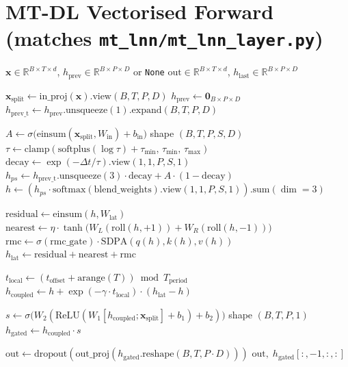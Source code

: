 \documentclass[11pt]{article}
\theoremstyle{definition}
\newcommand{\RR}{\mathbb{R}}
\newcommand{\vx}{\mathbf{x}}
\newcommand{\sigmoid}{\sigma}
\begin{document}
\appendix

\section{MT-DL Vectorised Forward (matches \texttt{mt\_lnn/mt\_lnn\_layer.py})}
\label{app:code}

\begin{algorithm}[h]
\caption{MTLNNLayer.forward — vectorised over P protofilaments}
\label{alg:mt_dl}
\begin{algorithmic}[1]
\Require $\vx\in\RR^{B\times T\times d}$,\; $h_\text{prev}\in\RR^{B\times P\times D}$ or \texttt{None}
\Ensure $\text{out}\in\RR^{B\times T\times d}$,\; $h_\text{last}\in\RR^{B\times P\times D}$

\State $\vx_\text{split} \leftarrow \text{in\_proj}(\vx).\text{view}(B,T,P,D)$ 
 $h_\text{prev}\leftarrow\mathbf{0}_{B\times P\times D}$ \EndIf
\State $h_\text{prev\_t}\leftarrow h_\text{prev}.\text{unsqueeze}(1).\text{expand}(B,T,P,D)$

\State {}
\State $A \leftarrow \sigmoid\!\bigl(\text{einsum}(\vx_\text{split}, W_\text{in}) + b_\text{in}\bigr)$ \quad shape $(B,T,P,S,D)$
\State $\tau \leftarrow \text{clamp}(\text{softplus}(\log\tau)+\tau_\text{min},\,\tau_\text{min},\,\tau_\text{max})$
\State $\text{decay} \leftarrow \exp(-\Delta t/\tau).\text{view}(1,1,P,S,1)$
\State $h_{ps} \leftarrow h_\text{prev\_t}.\text{unsqueeze}(3)\cdot\text{decay} + A\cdot(1-\text{decay})$
\State $h \leftarrow (h_{ps}\cdot\text{softmax}(\text{blend\_weights}).\text{view}(1,1,P,S,1)).\text{sum}(\dim=3)$ 

\State {}
\State $\text{residual} \leftarrow \text{einsum}(h, W_\text{lat})$
\State $\text{nearest} \leftarrow \eta\cdot\tanh\!\bigl(W_L(\text{roll}(h,+1))+W_R(\text{roll}(h,-1))\bigr)$
\State $\text{rmc} \leftarrow \sigmoid(\text{rmc\_gate})\cdot\text{SDPA}(q(h),k(h),v(h))$
\State $h_\text{lat} \leftarrow \text{residual}+\text{nearest}+\text{rmc}$

\State {}
\State $t_\text{local} \leftarrow (t_\text{offset}+\text{arange}(T))\bmod T_\text{period}$
\State $h_\text{coupled} \leftarrow h + \exp(-\gamma\cdot t_\text{local})\cdot(h_\text{lat}-h)$

\State {}
\State $s \leftarrow \sigmoid\!\bigl(W_2(\mathrm{ReLU}(W_1[h_\text{coupled};\vx_\text{split}]+b_1)+b_2)\bigr)$ \quad shape $(B,T,P,1)$
\State $h_\text{gated} \leftarrow h_\text{coupled}\cdot s$

\State $\text{out} \leftarrow \text{dropout}(\text{out\_proj}(h_\text{gated}.\text{reshape}(B,T,P\cdot D)))$
\State \Return $\text{out},\; h_\text{gated}[:,{-1},:,:]$
\end{algorithmic}
\end{algorithm}
\end{document}
